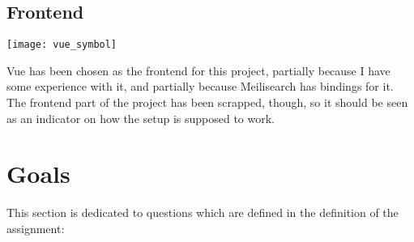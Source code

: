 \documentclass[a4paper, 12pt]{article}
\begin{document}
\subsection{Frontend}
\texttt{[image: vue\_symbol]}

Vue has been chosen as the frontend for this project, partially because I have some experience with it, and partially because Meilisearch has bindings for it. The frontend part of the project has been scrapped, though, so it should be seen as an indicator on how the setup is supposed to work. 

\section{Goals}
This section is dedicated to questions which are defined in the definition of the assignment:
\end{document}
